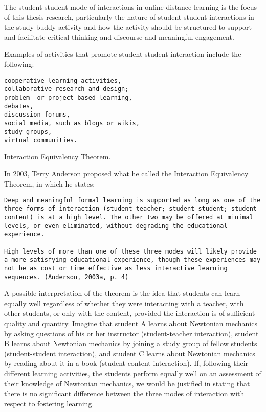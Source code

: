 \documentclass[
]{book}
\theoremstyle{definition}
\theoremstyle{definition}
\theoremstyle{definition}
\theoremstyle{definition}
\theoremstyle{remark}
\begin{document}
The student-student mode of interactions in online distance learning is the focus of this thesis research, particularly the nature of student-student interactions in the study buddy activity and how the activity should be structured to support and facilitate critical thinking and discourse and meaningful engagement.

Examples of activities that promote student-student interaction include the following:

\begin{verbatim}
cooperative learning activities,
collaborative research and design;
problem- or project-based learning,
debates,
discussion forums,
social media, such as blogs or wikis,
study groups,
virtual communities.
\end{verbatim}

Interaction Equivalency Theorem.

In 2003, Terry Anderson proposed what he called the Interaction Equivalency Theorem, in which he states:

\begin{verbatim}
Deep and meaningful formal learning is supported as long as one of the three forms of interaction (student–teacher; student-student; student-content) is at a high level. The other two may be offered at minimal levels, or even eliminated, without degrading the educational experience.

High levels of more than one of these three modes will likely provide a more satisfying educational experience, though these experiences may not be as cost or time effective as less interactive learning sequences. (Anderson, 2003a, p. 4)
\end{verbatim}

A possible interpretation of the theorem is the idea that students can learn equally well regardless of whether they were interacting with a teacher, with other students, or only with the content, provided the interaction is of sufficient quality and quantity. Imagine that student A learns about Newtonian mechanics by asking questions of his or her instructor (student-teacher interaction), student B learns about Newtonian mechanics by joining a study group of fellow students (student-student interaction), and student C learns about Newtonian mechanics by reading about it in a book (student-content interaction). If, following their different learning activities, the students perform equally well on an assessment of their knowledge of Newtonian mechanics, we would be justified in stating that there is no significant difference between the three modes of interaction with respect to fostering learning.
\end{document}
